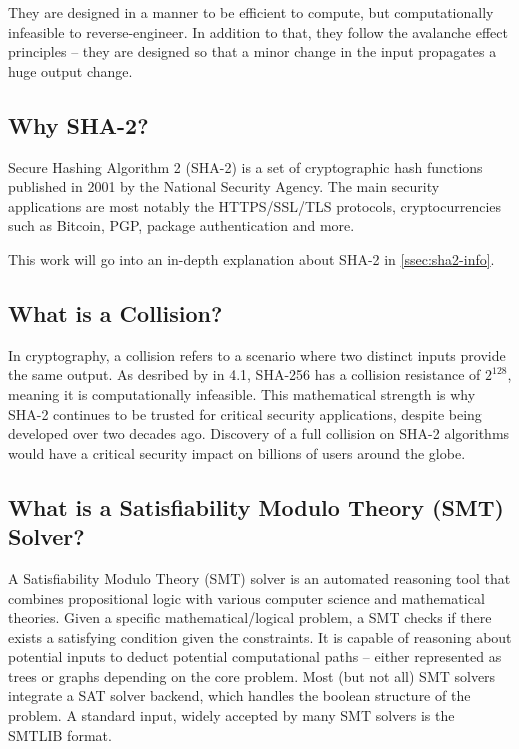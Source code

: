 \documentclass[a4paper]{report}
\begin{document}
They are designed in a manner to be efficient to compute, but computationally infeasible to reverse-engineer.
In addition to that, they follow the avalanche effect principles -- they are designed so that a minor change in the input propagates a huge output change.

\subsection{Why SHA-2?}
Secure Hashing Algorithm 2 (SHA-2) is a set of cryptographic hash functions published in 2001 by the National Security Agency.
The main security applications are most notably the HTTPS/SSL/TLS protocols, cryptocurrencies such as Bitcoin, PGP, package authentication and more. \cite{wiki:SHA2}

This work will go into an in-depth explanation about SHA-2 in \ref{ssec:sha2-info}.

\subsection{What is a Collision?}
In cryptography, a collision refers to a scenario where two distinct inputs provide the same output.
As desribed by \cite{NIST_SP_800_107} in 4.1, SHA-256 has a collision resistance of $2^{128}$, meaning it is computationally infeasible.
This mathematical strength is why SHA-2 continues to be trusted for critical security applications, despite being developed over two decades ago.
Discovery of a full collision on SHA-2 algorithms would have a critical security impact on billions of users around the globe.

\subsection{What is a Satisfiability Modulo Theory (SMT) Solver?}
A Satisfiability Modulo Theory (SMT) solver is an automated reasoning tool that combines propositional logic with various computer science and mathematical theories.
Given a specific mathematical/logical problem, a SMT checks if there exists a satisfying condition given the constraints.
It is capable of reasoning about potential inputs to deduct potential computational paths -- either represented as trees or graphs depending on the core problem.
Most (but not all) SMT solvers integrate a SAT solver backend, which handles the boolean structure of the problem.
A standard input, widely accepted by many SMT solvers is the SMTLIB format. \cite{SMTLIB}
\end{document}
